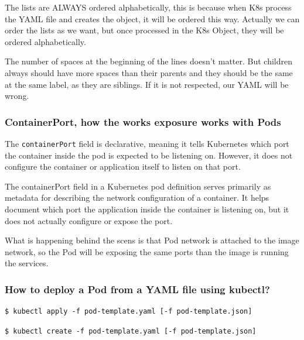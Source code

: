 \documentclass{article}
\newenvironment{blocktemplateI}[1]{%
    \tcolorbox[beamer,%
    noparskip,breakable,
    colframe=Violet,%
    colbacklower=Black,%
    title=#1]}%
    {\endtcolorbox}
\newenvironment{blocktemplateII}[1]{%
    \tcolorbox[beamer,%
    noparskip,breakable,
    colframe=Green,%
    colbacklower=LimeGreen!75!LightGreen,%
    title=#1]}%
    {\endtcolorbox}
\newenvironment{codetemplate}[1][]{%
  \mybasecolorbox[#1]
  \itshape
}{%
  \endmybasecolorbox
}
\begin{document}
\begin{blocktemplateI}{NOTE}
The lists are ALWAYS ordered alphabetically, this is because when K8s process the YAML file and creates the object, it will be ordered this way. Actually we can order the lists as we want, but once processed in the K8s Object, they will be ordered alphabetically.
\end{blocktemplateI}

\begin{blocktemplateII}{Note}
The number of spaces at the beginning of the lines doesn't matter. But children always should have more spaces than their parents and they should be the same at the same label, as they are siblings. If it is not respected, our YAML will be wrong.
\end{blocktemplateII}

\subsubsection{ContainerPort, how the works exposure works with Pods}

The \verb|containerPort| field is declarative, meaning it tells Kubernetes which port the container inside the pod is expected to be listening on. However, it does not configure the container or application itself to listen on that port.

The containerPort field in a Kubernetes pod definition serves primarily as metadata for describing the network configuration of a container. It helps document which port the application inside the container is listening on, but it does not actually configure or expose the port.

What is happening behind the scens is that Pod network is attached to the image network, so the Pod will be exposing the same ports than the image is running the services.

\subsubsection{How to deploy a Pod from a YAML file using kubectl?}

\begin{codetemplate}{}
\begin{verbatim}
$ kubectl apply -f pod-template.yaml [-f pod-template.json]
\end{verbatim}
\end{codetemplate}
\begin{codetemplate}{}
\begin{verbatim}
$ kubectl create -f pod-template.yaml [-f pod-template.json]
\end{verbatim}
\end{codetemplate}
\end{document}
